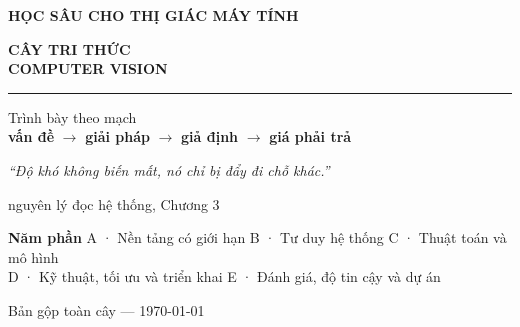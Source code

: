 \documentclass[11pt,a4paper,oneside]{report}
\begin{document}
\begin{titlepage}
\thispagestyle{empty}

\vspace*{4.2cm}
\begin{flushleft}
{\sffamily\bfseries\color{accent}\large HỌC SÂU CHO THỊ GIÁC MÁY TÍNH\par}
\vspace{0.5cm}
{\sffamily\bfseries\color{inkblue}\fontsize{40}{45}\selectfont
CÂY TRI THỨC\\[0.12em] COMPUTER VISION\par}
\vspace{0.9cm}
{\color{accent}\rule{7cm}{2.4pt}}\par
\vspace{0.9cm}
{\large\color{inkblue!85}
Trình bày theo mạch\\[0.25em]
\textbf{vấn đề} \(\rightarrow\) \textbf{giải pháp} \(\rightarrow\) \textbf{giả định} \(\rightarrow\) \textbf{giá phải trả}\par}
\end{flushleft}

\vfill
\begin{flushleft}
{\itshape\color{tiercol}``Độ khó không biến mất, nó chỉ bị đẩy đi chỗ khác.''\par}
{\footnotesize\sffamily\color{tiercol}nguyên lý đọc hệ thống, Chương 3\par}
\vspace{1.1cm}
{\footnotesize\sffamily\color{inkblue}\textbf{Năm phần}\quad
A · Nền tảng có giới hạn \quad B · Tư duy hệ thống \quad C · Thuật toán và mô hình\\[0.25em]
\quad D · Kỹ thuật, tối ưu và triển khai \quad E · Đánh giá, độ tin cậy và dự án\par}
\vspace{0.5em}
{\footnotesize\sffamily\color{tiercol}Bản gộp toàn cây --- \today\par}
\end{flushleft}
\end{titlepage}


\cleardoublepage
\tableofcontents
\cleardoublepage
{}











\printbibliography[title={Nguồn}]
\end{document}
